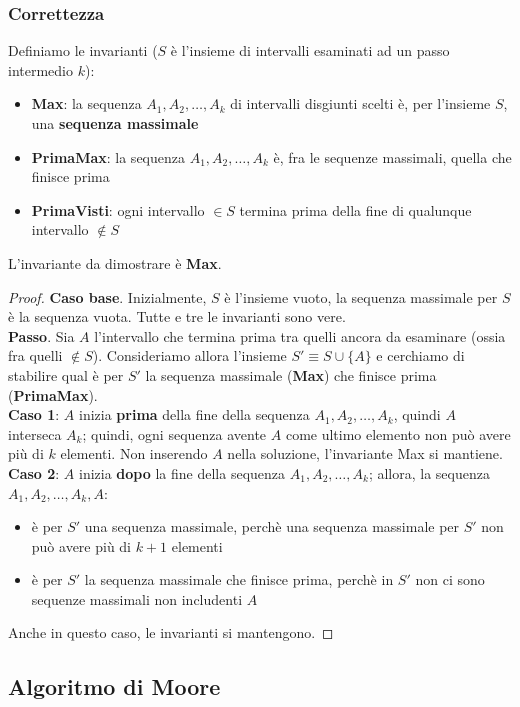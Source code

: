 \documentclass[11pt]{article}
\begin{document}
\subsubsection{Correttezza}
Definiamo le invarianti ($S$ è l'insieme di intervalli esaminati ad un passo intermedio $k$): 
\begin{itemize}
    \item \textbf{Max}: la sequenza $A_1,A_2,\dots,A_k$ di intervalli disgiunti scelti è, per l'insieme $S$, una \textbf{sequenza massimale}
    \item \textbf{PrimaMax}: la sequenza $A_1,A_2,\dots,A_k$ è, fra le sequenze massimali, quella che finisce prima 
    \item \textbf{PrimaVisti}: ogni intervallo $\in S$ termina prima della fine di qualunque intervallo $\notin S$
\end{itemize}
L'invariante da dimostrare è \textbf{Max}.
\begin{proof}
    \textbf{Caso base}. Inizialmente, $S$ è l'insieme vuoto, la sequenza massimale per $S$ è la sequenza vuota. Tutte e 
    tre le invarianti sono vere.\\
    \textbf{Passo}. Sia $A$ l'intervallo che termina prima tra quelli ancora da esaminare (ossia fra quelli $\notin S$).
    Consideriamo allora l'insieme $S'\equiv S \cup \{A\}$ e cerchiamo di stabilire qual è per $S'$ la sequenza massimale 
    (\textbf{Max}) che finisce prima (\textbf{PrimaMax}).\\
    \textbf{Caso 1}: $A$ inizia \textbf{prima} della fine della sequenza $A_1,A_2,\dots,A_k$, quindi $A$ interseca $A_k$; quindi, 
    ogni sequenza avente $A$ come ultimo elemento non può avere più di $k$ elementi. Non inserendo $A$ nella soluzione, 
    l'invariante Max si mantiene.\\
    \textbf{Caso 2}: $A$ inizia \textbf{dopo} la fine della sequenza $A_1,A_2,\dots,A_k$; allora, la sequenza $A_1,A_2,\dots,A_k,A$: 
    \begin{itemize}
        \item è per $S'$ una sequenza massimale, perchè una sequenza massimale per $S'$ non può avere più di $k+1$ elementi 
        \item è per $S'$ la sequenza massimale che finisce prima, perchè in $S'$ non ci sono sequenze massimali non includenti 
        $A$
    \end{itemize}
    Anche in questo caso, le invarianti si mantengono. 
\end{proof}
\subsection{Algoritmo di Moore}
\end{document}
